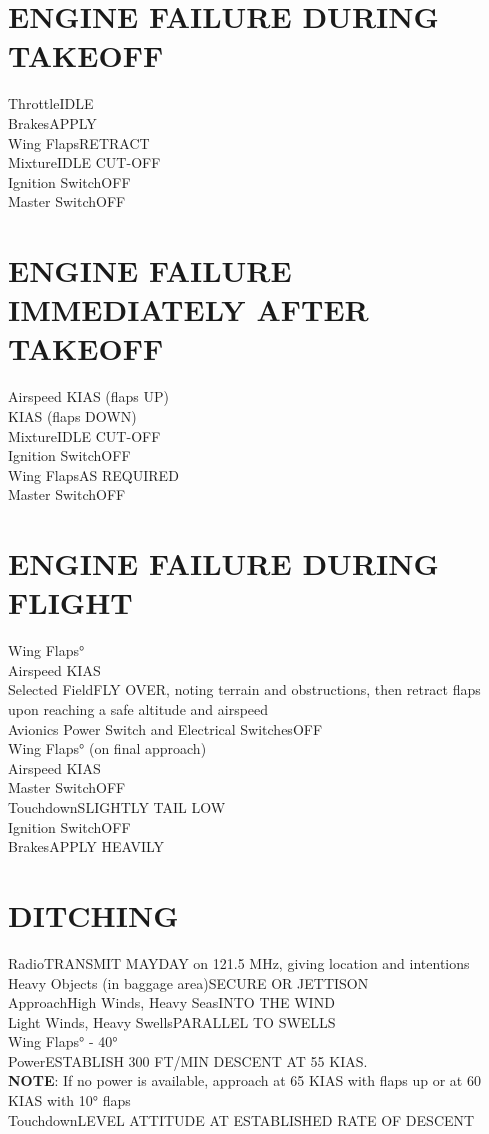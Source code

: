 \documentclass{article}
\begin{document}
\color{Black}
\begin{multicols*}{2}
\section*{ENGINE FAILURE DURING TAKEOFF}
Throttle\dotfill IDLE\\
Brakes\dotfill APPLY\\
Wing Flaps\dotfill RETRACT\\
Mixture\dotfill IDLE CUT-OFF\\
Ignition Switch\dotfill OFF\\
Master Switch\dotfill OFF
\section*{ENGINE FAILURE IMMEDIATELY AFTER TAKEOFF}
Airspeed KIAS (flaps UP)\\
 KIAS (flaps DOWN)\\
Mixture\dotfill IDLE CUT-OFF\\
Ignition Switch\dotfill OFF\\
Wing Flaps\dotfill AS REQUIRED\\
Master Switch\dotfill OFF
\section*{ENGINE FAILURE DURING FLIGHT}
Wing Flaps°\\
Airspeed KIAS\\
Selected Field\dotfill FLY OVER, noting terrain and obstructions, then retract flaps upon reaching a safe altitude and airspeed\\
Avionics Power Switch and Electrical Switches\dotfill OFF\\
Wing Flaps° (on final approach)\\
Airspeed KIAS\\
Master Switch\dotfill OFF\\
Touchdown\dotfill SLIGHTLY TAIL LOW\\
Ignition Switch\dotfill OFF\\
Brakes\dotfill  APPLY HEAVILY
\section*{DITCHING}
Radio\dotfill TRANSMIT MAYDAY on 121.5 MHz, giving location and intentions\\
Heavy Objects (in baggage area)\dotfill SECURE OR JETTISON\\
Approach\dotfill High Winds, Heavy Seas\dotfill INTO THE WIND\\
\hspace*{6mm}Light Winds, Heavy Swells\dotfill PARALLEL TO SWELLS\\
Wing Flaps° - 40°\\
Power\dotfill ESTABLISH 300 FT/MIN DESCENT AT 55 KIAS.\\
\centering \textbf{NOTE}:
If no power is available, approach at 65 KIAS with flaps up or at 60 KIAS with 10° flaps\\
Touchdown\dotfill LEVEL ATTITUDE AT ESTABLISHED RATE OF DESCENT

\end{multicols*}
\end{document}
